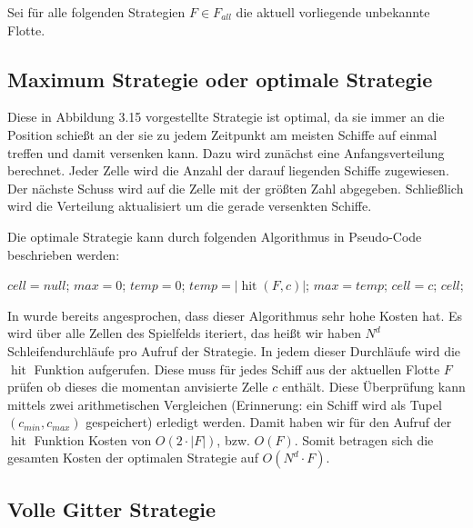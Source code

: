 \documentclass[a4paper,12pt]{llncs}
\numberwithin{equation}{section}
\DeclareMathOperator{\hit}{hit}
\begin{document}
Sei für alle folgenden Strategien $F\in F_{all}$ die aktuell vorliegende unbekannte Flotte.

\subsection{Maximum Strategie oder optimale Strategie}

Diese in \cite{M13} Abbildung 3.15 vorgestellte Strategie ist optimal, da sie immer an die Position schießt an der sie zu jedem Zeitpunkt am meisten Schiffe auf einmal treffen und damit versenken kann. Dazu wird zunächst eine Anfangsverteilung berechnet. Jeder Zelle wird die Anzahl der darauf liegenden Schiffe zugewiesen. Der nächste Schuss wird auf die Zelle mit der größten Zahl abgegeben. Schließlich wird die Verteilung aktualisiert um die gerade versenkten Schiffe.

Die optimale Strategie kann durch folgenden Algorithmus in Pseudo-Code beschrieben werden:

\begin{tcolorbox}
	\begin{algorithmic}
		\State $cell = null$;
		\State $max = 0$;
		\State $temp = 0$;
		\State $temp=\left|\hit(F,c)\right|$;
		\State $max=temp$;
		\State $cell = c$;
		\EndIf
		\EndFor
		\State \Return $cell$;
		\EndFunction
	\end{algorithmic}
\end{tcolorbox}

In \cite{M13} wurde bereits angesprochen, dass dieser Algorithmus sehr hohe Kosten hat. Es wird über alle Zellen des Spielfelds iteriert, das heißt wir haben $N^d$ Schleifendurchläufe pro Aufruf der Strategie. In jedem dieser Durchläufe wird die $\hit$ Funktion aufgerufen. Diese muss für jedes Schiff aus der aktuellen Flotte $F$ prüfen ob dieses die momentan anvisierte Zelle $c$ enthält. Diese Überprüfung kann mittels zwei arithmetischen Vergleichen (Erinnerung: ein Schiff wird als Tupel $(c_{min},c_{max})$ gespeichert) erledigt werden. Damit haben wir für den Aufruf der $\hit$ Funktion Kosten von $O(2\cdot |F|)$, bzw. $O(F)$. Somit betragen sich die gesamten Kosten der optimalen Strategie auf $O(N^d\cdot F)$. 

\subsection{Volle Gitter Strategie}
\end{document}
